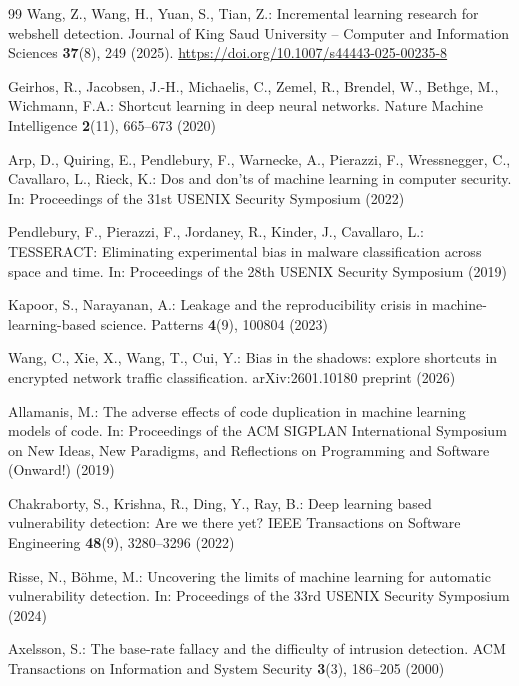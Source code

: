\documentclass[pdflatex,sn-mathphys-num]{sn-jnl}
\begin{document}
\begin{thebibliography}{99}
Wang, Z., Wang, H., Yuan, S., Tian, Z.: Incremental learning research for
webshell detection. Journal of King Saud University -- Computer and Information
Sciences \textbf{37}(8), 249 (2025).
\url{https://doi.org/10.1007/s44443-025-00235-8}

Geirhos, R., Jacobsen, J.-H., Michaelis, C., Zemel, R., Brendel, W., Bethge,
M., Wichmann, F.A.: Shortcut learning in deep neural networks. Nature Machine
Intelligence \textbf{2}(11), 665--673 (2020)

Arp, D., Quiring, E., Pendlebury, F., Warnecke, A., Pierazzi, F.,
Wressnegger, C., Cavallaro, L., Rieck, K.: Dos and don'ts of machine learning
in computer security. In: Proceedings of the 31st USENIX Security Symposium
(2022)

Pendlebury, F., Pierazzi, F., Jordaney, R., Kinder, J., Cavallaro, L.:
TESSERACT: Eliminating experimental bias in malware classification across
space and time. In: Proceedings of the 28th USENIX Security Symposium (2019)

Kapoor, S., Narayanan, A.: Leakage and the reproducibility crisis in
machine-learning-based science. Patterns \textbf{4}(9), 100804 (2023)

Wang, C., Xie, X., Wang, T., Cui, Y.: Bias in the shadows: explore shortcuts in
encrypted network traffic classification. arXiv:2601.10180 preprint (2026)

Allamanis, M.: The adverse effects of code duplication in machine learning
models of code. In: Proceedings of the ACM SIGPLAN International Symposium on
New Ideas, New Paradigms, and Reflections on Programming and Software
(Onward!) (2019)

Chakraborty, S., Krishna, R., Ding, Y., Ray, B.: Deep learning based
vulnerability detection: Are we there yet? IEEE Transactions on Software
Engineering \textbf{48}(9), 3280--3296 (2022)

Risse, N., B{\"o}hme, M.: Uncovering the limits of machine learning for
automatic vulnerability detection. In: Proceedings of the 33rd USENIX Security
Symposium (2024)

Axelsson, S.: The base-rate fallacy and the difficulty of intrusion detection.
ACM Transactions on Information and System Security \textbf{3}(3), 186--205
(2000)


\end{thebibliography}
\end{document}
